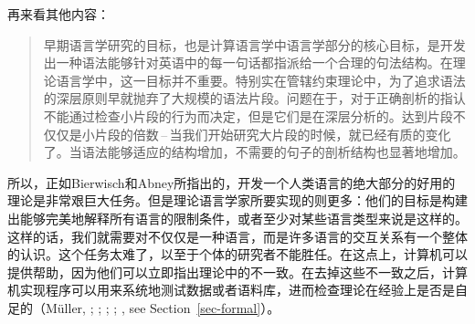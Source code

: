 再来看其他内容：
\begin{quote}
早期语言学研究的目标，也是计算语言学中语言学部分的核心目标，是开发出一种语法能够针对英语中的每一句话都指派给一个合理的句法结构。在理论语言学中，这一目标并不重要。特别实在管辖约束理论中，为了追求语法的深层原则早就抛弃了大规模的语法片段。问题在于，对于正确剖析的指认不能通过检查小片段的行为而决定，但是它们是在深层分析的。达到片段不仅仅是小片段的倍数\,--\,当我们开始研究大片段的时候，就已经有质的变化了。当语法能够适应的结构增加，不需要的句子的剖析结构也显著地增加。\citep[]{Abney96a}
\end{quote}
%
所以，正如Bierwisch和Abney所指出的，开发一个人类语言的绝大部分的好用的理论是非常艰巨大任务。但是理论语言学家所要实现的则更多：他们的目标是构建出能够完美地解释所有语言的限制条件，或者至少对某些语言类型来说是这样的。这样的话，我们就需要对不仅仅是一种语言，而是许多语言的交互关系有一个整体的认识。这个任务太难了，以至于个体的研究者不能胜任。在这点上，计算机可以提供帮助，因为他们可以立即指出理论中的不一致。在去掉这些不一致之后，计算机实现程序可以用来系统地测试数据或者语料库，进而检查理论在经验上是否是自足的（Müller, \citeyear[Chapter~22]{Mueller99a}; \citeyear{MuellerCoreGram}; \citeyear{MuellerKernigkeit}; \citealp{OF98}; \citealp{Bender2008c}, see Section~\ref{sec-formal}）。

